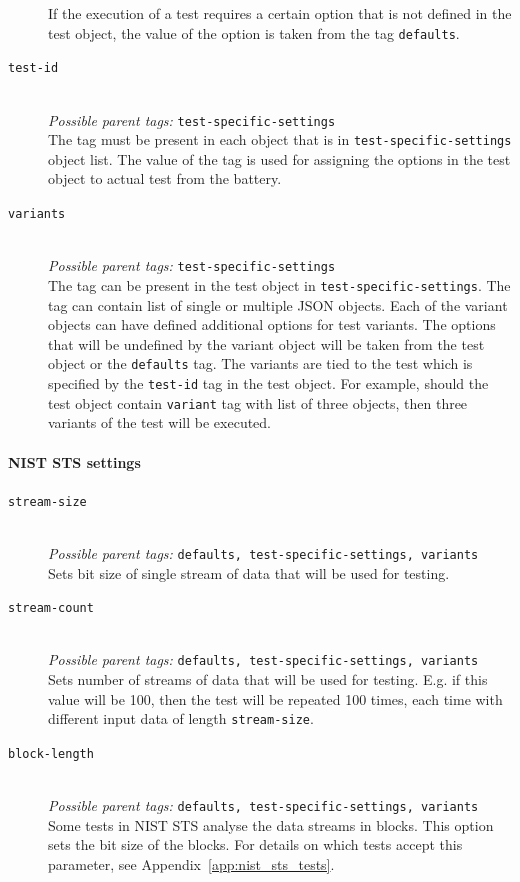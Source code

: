 \documentclass[
  digital,  	%
  color,		%
  oneside,   	%
  12pt,
  nocover,
  notable,
  nolof,
  nolot,
]{fithesis3}
\theoremstyle{definition}
\theoremstyle{remark}
\begin{document}
\begin{description}
If the execution of a test requires a certain option that is not defined in the test object, the value of the option is taken from the tag \texttt{defaults}.

\item[\texttt{test-id}] \hfill \\
\textit{Possible parent tags: } \texttt{test-specific-settings} \\
The tag must be present in each object that is in \texttt{test-specific-settings} object list. The value of the tag is used for assigning the options in the test object to actual test from the battery.

\item[\texttt{variants}] \hfill \\
\textit{Possible parent tags: } \texttt{test-specific-settings} \\
The tag can be present in the test object in \texttt{test-specific-settings}. The tag can contain list of single or multiple JSON objects. Each of the variant objects can have defined additional options for test variants. The options that will be undefined by the variant object will be taken from the test object or the \texttt{defaults} tag. The variants are tied to the test which is specified by the \texttt{test-id} tag in the test object. For example, should the test object contain \texttt{variant} tag with list of three objects, then three variants of the test will be executed.
\end{description}

\paragraph{NIST STS settings}

\begin{description}
\item[\texttt{stream-size}] \hfill \\
\textit{Possible parent tags: } \texttt{defaults, test-specific-settings, variants} \\
Sets bit size of single stream of data that will be used for testing.

\item[\texttt{stream-count}] \hfill \\
\textit{Possible parent tags: } \texttt{defaults, test-specific-settings, variants} \\
Sets number of streams of data that will be used for testing. E.g. if this value will be 100, then the test will be repeated 100 times, each time with different input data of length \texttt{stream-size}.

\item[\texttt{block-length}] \hfill \\
\textit{Possible parent tags: } \texttt{defaults, test-specific-settings, variants} \\
Some tests in NIST STS analyse the data streams in blocks. This option sets the bit size of the blocks. For details on which tests accept this parameter, see Appendix~\ref{app:nist_sts_tests}.

\end{description}
\end{document}
